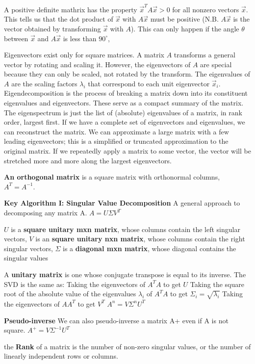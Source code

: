 \documentclass{article}
\begin{document}
A positive definite mathrix has the property $\vec{x}^T A \vec{x} > 0$ for all nonzero vectors $\vec{x}$.
This tells us that the dot product of $\vec{x}$ with $A \vec{x}$ must be positive
(N.B. $A \vec{x}$ is the vector obtained by transforming $\vec{x}$ with $A$).
This can only happen if the angle $\theta$ between $\vec{x}$ and $A \vec{x}$ is less than $90^\circ$,

Eigenvectors exist only for square matrices.
A matrix $A$ transforms a general vector by rotating and scaling it.
However, the eigenvectors of $A$ are special because they can only be scaled, not rotated by the transform.
The eigenvalues of $A$ are the scaling factors $\lambda_i$ that correspond to each unit eigenvector $\vec{x}_i$.
Eigendecomposition is the process of breaking a matrix down into its constituent eigenvalues
and eigenvectors. These serve as a compact summary of the matrix.
The eigenspectrum is just the list of (absolute) eigenvalues of a matrix, in rank order, largest first.
If we have a complete set of eigenvectors and eigenvalues, we can reconstruct the matrix.
We can approximate a large matrix with a few leading eigenvectors; this is a simplified or
truncated approximation to the original matrix.
If we repeatedly apply a matrix to some vector, the vector will be stretched more and more
along the largest eigenvectors.

\textbf{An orthogonal matrix} is a square matrix with orthonormal columns, $A^T = A^{-1}$.

\textbf{Key Algorithm I\@: Singular Value Decomposition}
A general approach to decomposing any matrix A.
$A = U \Sigma V^T$

$U$ is a \textbf{square unitary mxn matrix}, whose columns contain the left singular vectors,
$V$ is an \textbf{square unitary nxn matrix}, whose columns contain the right singular vectors,
$\Sigma$ is a \textbf{diagonal mxn matrix}, whose diagonal contains the singular values

A \textbf{unitary matrix} is one whose conjugate transpose is equal to its inverse.
The SVD is the same as:
Taking the eigenvectors of $A^T A$ to get $U$
Taking the square root of the absolute value of the eigenvalues $\lambda_i$ of $A^T A$ to get $\Sigma_i = \sqrt{\lambda_i}$
Taking the eigenvectors of $A A^T$ to get $V^T$
$A^n = V \Sigma^n U^T$

\textbf{Pseudo-inverse}
We can also pseudo-inverse a matrix A+ even if A is not square.
$A^+ = V \Sigma^{-1} U^T$

the \textbf{Rank} of a matrix is the number of non-zero singular values,
or the number of linearly independent rows or columns.
\end{document}
